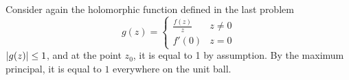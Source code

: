 \documentclass{homework}
\begin{document}
                                                                                                                                                                                                                                                                          \begin{solution}
                                                                                                                                                                                                                                                                          Consider again the holomorphic function defined in the last problem
                                                                                                                                                                                                                                                                          \[
                                                                                                                                                                                                                                                                          g(z) = \begin{cases}\frac{f(z)}{z} & z \neq 0 \\ f'(0) & z= 0\end{cases}
                                                                                                                                                                                                                                                                          \]
                                                                                                                                                                                                                                                                          $\left|g(z)\right|\leq 1$, and at the point $z_0$, it is equal to 1 by assumption. By the maximum principal, it is equal to $1$ everywhere on the unit ball.
                                                                                                                                                                                                                                                                          \end{solution}
\end{document}
